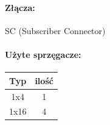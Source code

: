 	\paragraph{Złącza:}
		SC (Subscriber Connector)
	\paragraph{Użyte sprzęgacze:}
		\begin{center}
			\begin{table}[htbp]
				\begin{tabular}{|c|c|}
					\hline
					\textbf{Typ} & \textbf{ilość} \\ \hline
					1x4          & 1              \\ \hline
					1x16         & 4              \\ \hline
				\end{tabular}
			\end{table}
		\end{center}
